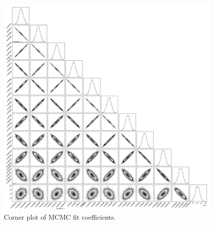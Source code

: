 \begin{figure}[ht]
  \includegraphics[width=\columnwidth]{img/line-triangle.pdf}
  \caption{Corner plot of MCMC fit coefficients.}
  \label{fig:MCMC_triangle}
\end{figure}

